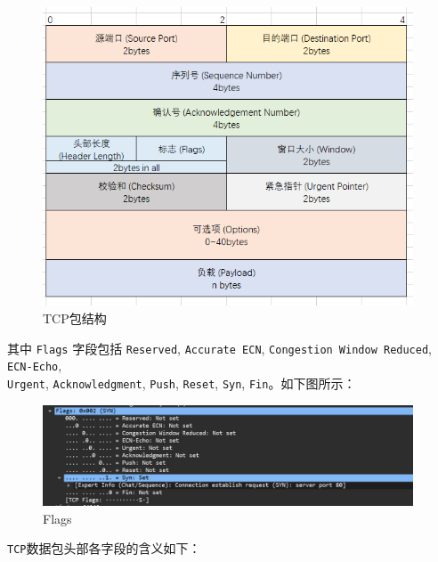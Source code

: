 \documentclass{article}
\begin{document}
	\begin{figure}[H]
		\centering
		\includegraphics[width=11cm]{images/15.TCP包结构.png}
		\caption{TCP包结构}
	\end{figure}
	
	其中 \texttt{Flags} 字段包括 \texttt{Reserved}, \texttt{Accurate ECN}, \texttt{Congestion Window Reduced}, \texttt{ECN-Echo}, \\ \texttt{Urgent}, \texttt{Acknowledgment}, \texttt{Push}, \texttt{Reset}, \texttt{Syn}, \texttt{Fin}。如下图所示：
	
	\begin{figure}[H]
		\centering
		\includegraphics[width=11cm]{images/16.Flags内容.png}
		\caption{Flags}
	\end{figure}
	
	\texttt{TCP}数据包头部各字段的含义如下：
	
\end{document}
